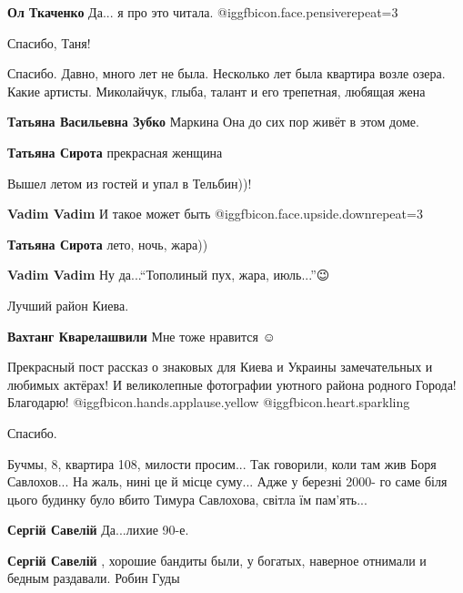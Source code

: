 \begin{itemize}
\textbf{Ол Ткаченко} Да... я про это читала. @igg{fbicon.face.pensive}{repeat=3} 

Спасибо, Таня!


Спасибо. Давно, много лет не была. Несколько лет была квартира возле озера.
Какие артисты. Миколайчук, глыба, талант и его трепетная, любящая жена

\begin{itemize} %
\textbf{Татьяна Васильевна Зубко} Маркина Она до сих пор живёт в этом доме.

\textbf{Татьяна Сирота} прекрасная женщина
\end{itemize} %

Вышел летом из гостей и упал в Тельбин))!

\begin{itemize} %
\textbf{Vadim Vadim} И такое может быть @igg{fbicon.face.upside.down}{repeat=3} 

\textbf{Татьяна Сирота} лето, ночь, жара))

\textbf{Vadim Vadim} Ну да...\enquote{Тополиный пух, жара, июль...}😉
\end{itemize} %

Лучший район Киева.

\textbf{Вахтанг Кварелашвили} Мне тоже нравится ☺ ️ 


Прекрасный пост рассказ о знаковых для Киева и Украины замечательных и любимых
актёрах! И великолепные фотографии уютного района родного Города! Благодарю!
 @igg{fbicon.hands.applause.yellow}  @igg{fbicon.heart.sparkling} 

Спасибо.


Бучмы, 8, квартира 108, милости просим... Так говорили, коли там жив Боря
Савлохов... На жаль, нині це й місце суму... Адже у березні 2000- го саме біля
цього будинку було вбито Тимура Савлохова, світла їм пам'ять...

\begin{itemize} %
\textbf{Сергій Савелій} Да...лихие 90-е.

\textbf{Сергій Савелій} , хорошие бандиты были, у богатых, наверное отнимали и бедным раздавали. Робин Гуды


\end{itemize}
\end{itemize}
